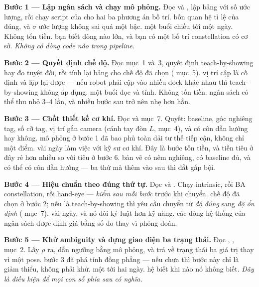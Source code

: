 \documentclass[../../marker.tex]{subfiles}
\begin{document}
\begin{mach}
\item {}
\gp \textbf{Bước 1 --- Lập ngân sách và chạy mô phỏng.} Đọc  và , lập bảng với số ước lượng, rồi chạy script của  cho hai ba phương án bố trí.
\gd bốn quan hệ tỉ lệ của  đúng, và \(\sigma\) ước lượng không sai quá một bậc.
\gia một buổi chiều tới một ngày. Không tốn tiền.
\hq bạn biết dòng nào lớn, và bạn có một bố trí constellation có cơ sở. \emph{Không có dòng code nào trong pipeline.}

\item {}
\gp \textbf{Bước 2 --- Quyết định chế độ.} Đọc  mục~1 và~3, quyết định teach-by-showing hay đo tuyệt đối, rồi tính lại bảng cho chế độ đã chọn ( mục~5).
\gd vị trí cập là cố định và lặp lại được --- nếu robot phải cập vào nhiều dock khác nhau thì teach-by-showing không áp dụng.
\gia một buổi đọc và tính. Không tốn tiền.
\hq ngân sách có thể thu nhỏ 3--4 lần, và nhiều bước sau trở nên nhẹ hơn hẳn.

\item {}
\gp \textbf{Bước 3 --- Chốt thiết kế cơ khí.} Đọc  và  mục~7. Quyết: baseline, góc nghiêng tag, số cỡ tag, vị trí gắn camera (cánh tay đòn \(L\),  mục~4), và có côn dẫn hướng hay không.
\gd mô phỏng ở bước 1 đã bao phủ toàn dải tư thế tiếp cận, không chỉ một điểm.
\gia vài ngày làm việc với kỹ sư cơ khí. Đây là bước tốn tiền, và tiền tiêu ở đây rẻ hơn nhiều so với tiêu ở bước 6.
\hq bản vẽ có nêm nghiêng, có baseline đủ, và có thể có côn dẫn hướng --- ba thứ mà thêm vào sau thì đắt gấp bội.

\item {}
\gp \textbf{Bước 4 --- Hiệu chuẩn theo đúng thứ tự.} Đọc  và . Chạy intrinsic, rồi BA constellation, rồi hand-eye --- \emph{kiểm sau mỗi bước} trước khi chuyển.
\gd chế độ đã chọn ở bước 2; nếu là teach-by-showing thì yêu cầu chuyển từ \emph{độ đúng} sang \emph{độ ổn định} ( mục~7).
\gia vài ngày, và nó đòi kỷ luật hơn kỹ năng.
\hq các dòng hệ thống của ngân sách được định giá bằng số đo thay vì phỏng đoán.

\item {}
\gp \textbf{Bước 5 --- Khử ambiguity và dựng giao diện ba trạng thái.} Đọc , ,  mục~2. Lấy \(\rho\) ra, dẫn ngưỡng bằng mô phỏng, và trả về trạng thái ba giá trị thay vì một pose.
\gd bước 3 đã phá tính đồng phẳng --- nếu chưa thì bước này chỉ là giảm thiểu, không phải khử.
\gia một tới hai ngày.
\hq hệ biết khi nào nó không biết. \emph{Đây là điều kiện để mọi con số phía sau có nghĩa.}


\end{mach}
\end{document}
